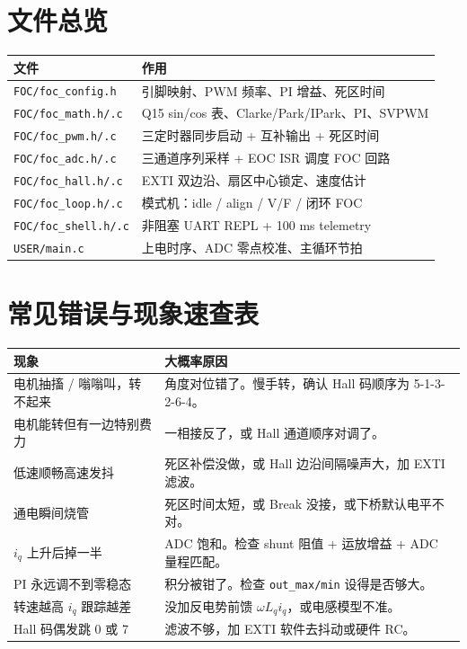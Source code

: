 \documentclass[UTF8,a4paper,11pt]{ctexart}
\newcommand{\code}[1]{\texttt{#1}}
\begin{document}
\section{文件总览}

\begin{table}[h]
\centering
\begin{tabular}{ll}
\toprule
文件 & 作用 \\
\midrule
\code{FOC/foc\_config.h}    & 引脚映射、PWM 频率、PI 增益、死区时间 \\
\code{FOC/foc\_math.h/.c}   & Q15 sin/cos 表、Clarke/Park/IPark、PI、SVPWM \\
\code{FOC/foc\_pwm.h/.c}    & 三定时器同步启动 + 互补输出 + 死区时间 \\
\code{FOC/foc\_adc.h/.c}    & 三通道序列采样 + EOC ISR 调度 FOC 回路 \\
\code{FOC/foc\_hall.h/.c}   & EXTI 双边沿、扇区中心锁定、速度估计 \\
\code{FOC/foc\_loop.h/.c}   & 模式机：idle / align / V/F / 闭环 FOC \\
\code{FOC/foc\_shell.h/.c}  & 非阻塞 UART REPL + 100 ms telemetry \\
\code{USER/main.c}          & 上电时序、ADC 零点校准、主循环节拍 \\
\bottomrule
\end{tabular}
\end{table}

\section{常见错误与现象速查表}

\begin{table}[h]
\centering
\small
\begin{tabular}{p{5cm}p{8cm}}
\toprule
现象 & 大概率原因 \\
\midrule
电机抽搐 / 嗡嗡叫，转不起来 & 角度对位错了。慢手转，确认 Hall 码顺序为 5-1-3-2-6-4。 \\
电机能转但有一边特别费力   & 一相接反了，或 Hall 通道顺序对调了。 \\
低速顺畅高速发抖           & 死区补偿没做，或 Hall 边沿间隔噪声大，加 EXTI 滤波。 \\
通电瞬间烧管               & 死区时间太短，或 Break 没接，或下桥默认电平不对。 \\
$i_q$ 上升后掉一半         & ADC 饱和。检查 shunt 阻值 + 运放增益 + ADC 量程匹配。 \\
PI 永远调不到零稳态        & 积分被钳了。检查 \code{out\_max/min} 设得是否够大。 \\
转速越高 $i_q$ 跟踪越差    & 没加反电势前馈 $\omega L_q i_q$，或电感模型不准。 \\
Hall 码偶发跳 0 或 7       & 滤波不够，加 EXTI 软件去抖动或硬件 RC。 \\
\bottomrule
\end{tabular}
\end{table}
\end{document}
